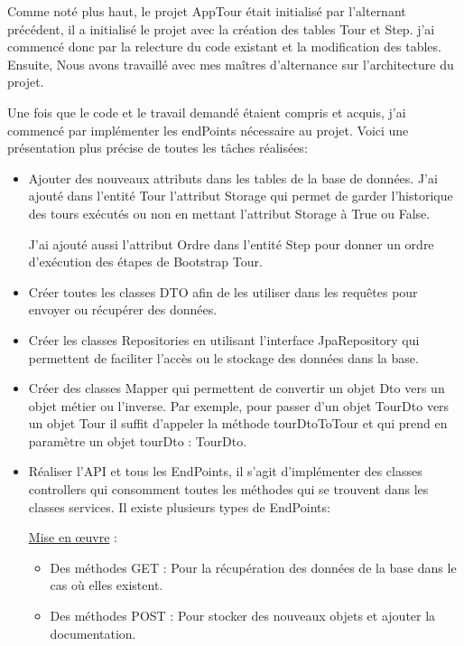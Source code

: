 \documentclass[12pt]{article}
\begin{document}
Comme noté plus haut, le projet AppTour était initialisé par l'alternant précédent, il a initialisé le projet avec la création des tables Tour et Step. j'ai commencé donc par la relecture du code existant et la modification des tables. Ensuite, Nous avons travaillé avec mes maîtres d'alternance sur l'architecture du projet.

Une fois que le code et le travail demandé étaient compris et acquis, j'ai commencé par implémenter les endPoints nécessaire au projet. Voici une présentation plus précise de toutes les tâches réalisées:   

\begin{itemize}

\item  Ajouter des nouveaux attributs dans les tables de la base de données. J'ai ajouté dans l'entité Tour  l’attribut Storage qui permet de garder l'historique des tours exécutés ou non en mettant l’attribut Storage à True ou False.
  
J'ai ajouté aussi l'attribut Ordre dans l'entité Step pour donner un ordre  d’exécution des étapes de Bootstrap Tour. 

\item Créer toutes les classes DTO afin de les utiliser dans les requêtes  pour envoyer ou récupérer des données.

\item Créer les classes Repositories en utilisant l'interface JpaRepository qui permettent de faciliter l'accès ou le stockage des données dans la base.

\item Créer des classes Mapper qui permettent de convertir un objet Dto vers un objet métier ou l'inverse. Par exemple, pour passer d'un objet TourDto vers un objet Tour il suffit d'appeler la méthode tourDtoToTour et qui prend en paramètre un objet tourDto : TourDto.  

\item Réaliser l'API et tous les EndPoints, il s'agit d’implémenter des classes controllers qui consomment toutes les méthodes qui se trouvent dans les classes services. Il existe plusieurs types de EndPoints: 

\underline{Mise en œuvre} : 
\begin{itemize}
\item Des méthodes GET : Pour la récupération des données de la base dans le cas où elles existent.

\item Des méthodes POST : Pour stocker des nouveaux objets et ajouter la documentation. 


\end{itemize}
\end{itemize}
\end{document}
